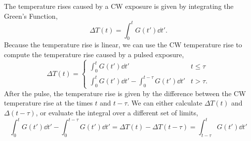 \documentclass[]{article}
\begin{document}
The temperature rises caused by a CW exposure is given by integrating the Green's Function,
\begin{equation}
  \Delta T(t) = \int_{0}^{t} G(t') \dd t'.
\end{equation}
Because the temperature rise is linear, we can use the CW temperature rise to compute
the temperature rise caused by a pulsed exposure,
\begin{equation}
  \Delta T(t) = \begin{cases}
    \int_{0}^{t} G(t') \dd t' & t \le \tau \\
    \int_{0}^{t} G(t') \dd t' - \int_{0}^{t-\tau} G(t') \dd t' & t > \tau.
\end{cases}
\end{equation}
After the pulse, the temperature rise is given by the difference between the CW temperature rise at the times $t$ and $t-\tau$.
We can either calculate $\Delta T(t)$ and $\Delta(t-\tau)$, or evaluate the integral over a different set of limits,
\begin{equation}
    \int_{0}^{t} G(t') \dd t' - \int_{0}^{t-\tau} G(t') \dd t'  = \Delta T(t) - \Delta T(t-\tau) = \int_{t-\tau}^{t} G(t') \dd t'
\end{equation}
\end{document}

